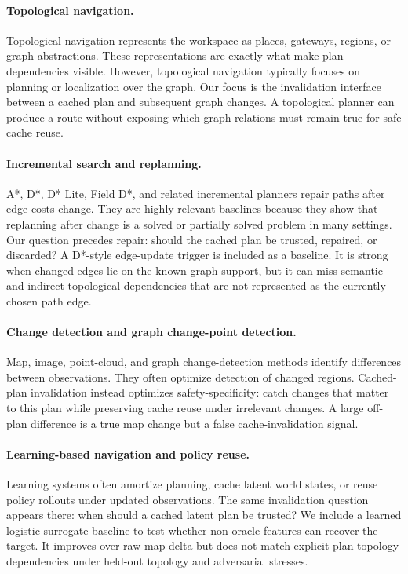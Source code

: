 \documentclass{article}
\begin{document}
\paragraph{Topological navigation.}
Topological navigation represents the workspace as places, gateways, regions, or graph abstractions. These representations are exactly what make plan dependencies visible. However, topological navigation typically focuses on planning or localization over the graph. Our focus is the invalidation interface between a cached plan and subsequent graph changes. A topological planner can produce a route without exposing which graph relations must remain true for safe cache reuse.

\paragraph{Incremental search and replanning.}
A*, D*, D* Lite, Field D*, and related incremental planners repair paths after edge costs change. They are highly relevant baselines because they show that replanning after change is a solved or partially solved problem in many settings. Our question precedes repair: should the cached plan be trusted, repaired, or discarded? A D*-style edge-update trigger is included as a baseline. It is strong when changed edges lie on the known graph support, but it can miss semantic and indirect topological dependencies that are not represented as the currently chosen path edge.

\paragraph{Change detection and graph change-point detection.}
Map, image, point-cloud, and graph change-detection methods identify differences between observations. They often optimize detection of changed regions. Cached-plan invalidation instead optimizes safety-specificity: catch changes that matter to this plan while preserving cache reuse under irrelevant changes. A large off-plan difference is a true map change but a false cache-invalidation signal.

\paragraph{Learning-based navigation and policy reuse.}
Learning systems often amortize planning, cache latent world states, or reuse policy rollouts under updated observations. The same invalidation question appears there: when should a cached latent plan be trusted? We include a learned logistic surrogate baseline to test whether non-oracle features can recover the target. It improves over raw map delta but does not match explicit plan-topology dependencies under held-out topology and adversarial stresses.
\end{document}
